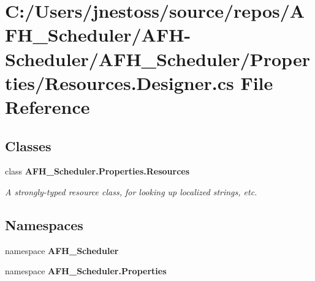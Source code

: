 \section{C\+:/\+Users/jnestoss/source/repos/\+A\+F\+H\+\_\+\+Scheduler/\+A\+F\+H-\/\+Scheduler/\+A\+F\+H\+\_\+\+Scheduler/\+Properties/\+Resources.Designer.\+cs File Reference}
\label{_resources_8_designer_8cs}
\subsection*{Classes}
\begin{DoxyCompactItemize}
\item 
class \textbf{ A\+F\+H\+\_\+\+Scheduler.\+Properties.\+Resources}
\begin{DoxyCompactList}\small\item\em A strongly-\/typed resource class, for looking up localized strings, etc. \end{DoxyCompactList}\end{DoxyCompactItemize}
\subsection*{Namespaces}
\begin{DoxyCompactItemize}
\item 
namespace \textbf{ A\+F\+H\+\_\+\+Scheduler}
\item 
namespace \textbf{ A\+F\+H\+\_\+\+Scheduler.\+Properties}
\end{DoxyCompactItemize}
